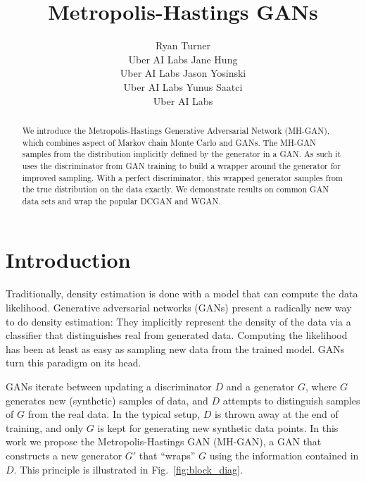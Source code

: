 \documentclass{article}
\title{Metropolis-Hastings GANs}
\author{
  Ryan Turner \\
  Uber AI Labs
  \And
  Jane Hung \\
  Uber AI Labs
  \And
  Jason Yosinski \\
  Uber AI Labs
  \And
  Yunus Saatci \\
  Uber AI Labs
}
\begin{document}

\maketitle

\begin{abstract}
We introduce the Metropolis-Hastings Generative Adversarial Network (MH-GAN), which combines aspect of Markov chain Monte Carlo and GANs.
The MH-GAN samples from the distribution implicitly defined by the generator in a GAN\@.
As such it uses the discriminator from GAN training to build a wrapper around the generator for improved sampling.
With a perfect discriminator, this wrapped generator samples from the true distribution on the data exactly.
We demonstrate results on common GAN data sets and wrap the popular DCGAN and WGAN\@.
\end{abstract}

\section{Introduction}

Traditionally, density estimation is done with a model that can compute the data likelihood.
Generative adversarial networks (GANs) \citep{Goodfellow2014} present a radically new way to do density estimation:
They implicitly represent the density of the data via a classifier that distinguishes real from generated data.
Computing the likelihood has been at least as easy as sampling new data from the trained model.
GANs turn this paradigm on its head.

GANs iterate between updating a discriminator $D$ and a generator $G$, where $G$ generates new (synthetic) samples of data, and $D$ attempts to distinguish samples of $G$ from the real data.
In the typical setup, $D$ is thrown away at the end of training, and only $G$ is kept for generating new synthetic data points.
In this work we propose the Metropolis-Hastings GAN (MH-GAN), a GAN that constructs a new generator $G'$ that ``wraps'' $G$ using the information contained in $D$.
This principle is illustrated in Fig.~\ref{fig:block_diag}.
\end{document}
